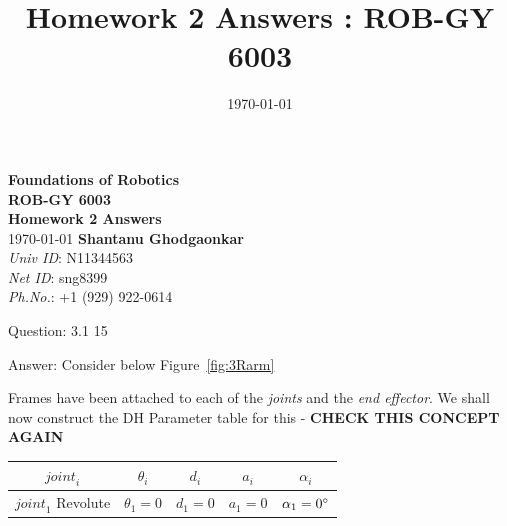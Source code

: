 \documentclass[a4paper]{article}
\title{Homework 2 Answers : ROB-GY 6003}
\author{\myName}
\date{\today}
\newcommand{\myName}{\textbf{Shantanu Ghodgaonkar}\\\textit{Univ ID}: N11344563\\\textit{Net ID}: sng8399\\\textit{Ph.No.}: +1 (929) 922-0614}
\begin{document}
	
	\begin{titlepage}
	    \centering
	    \vspace{2cm}
	    \Huge\textbf{Foundations of Robotics \\ ROB-GY 6003 \\ Homework 2 Answers}
	    \vspace{1cm}
	    \\ \Large \today
	    \vfill 
	    \Large \myName
	\end{titlepage}
	
	\begin{qalist}			
		\item[Question: 3.1] \setcounter{equation}{0} 15
		\item[Answer:] Consider below Figure~\ref{fig:3Rarm} \\
			\begin{minipage}{\linewidth}
				\vspace{0.5cm}
				\centering
				\label{fig:3Rarm}
				\vspace{0.5cm}
			\end{minipage}
			Frames have been attached to each of the \textit{joints} and the \textit{end effector}. 
			We shall now construct the DH Parameter table for this - \textbf{CHECK THIS CONCEPT AGAIN} \\
			\begin{minipage}{\linewidth}
				\vspace{0.5cm}
				\centering
				\begin{tabular}{|c|c|c|c|c|}
					\hline
					${joint}_{i}$ & ${\theta}_{i}$ & ${d}_{i}$ & ${a}_{i}$ & ${\alpha}_{i}$\\
					\hline
					${joint}_{1}$ Revolute & ${\theta}_{1} = 0$ & ${d}_{1} = 0$ & ${a}_{1} = 0$ & ${\alpha}_{1} = 0 \degree$\\

\end{tabular}
\end{minipage}
\end{qalist}
\end{document}
